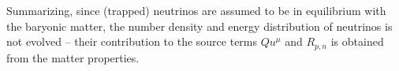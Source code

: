 Summarizing, since (trapped) neutrinos are assumed to be in equilibrium with the baryonic matter, the number density and energy distribution of neutrinos is not evolved -- their contribution to the source terms 
$Qu^{\mu}$ and 
$R_{p,n}$
 is obtained from the matter properties.



